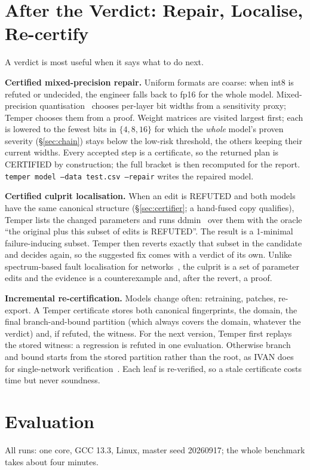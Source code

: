 \documentclass[conference]{IEEEtran}
\begin{document}
\section{After the Verdict: Repair, Localise, Re-certify}\label{sec:lifecycle}
A verdict is most useful when it says what to do next.

\textbf{Certified mixed-precision repair.} Uniform formats are coarse: when int8 is refuted or undecided, the engineer falls back to fp16 for the whole model. Mixed-precision quantisation~\cite{hawq} chooses per-layer bit widths from a sensitivity proxy; Temper chooses them from a proof. Weight matrices are visited largest first; each is lowered to the fewest bits in $\{4,8,16\}$ for which the \emph{whole} model's proven severity (\S\ref{sec:chain}) stays below the low-risk threshold, the others keeping their current widths. Every accepted step is a certificate, so the returned plan is CERTIFIED by construction; the full bracket is then recomputed for the report. \texttt{temper model --data test.csv --repair} writes the repaired model.

\textbf{Certified culprit localisation.} When an edit is REFUTED and both models have the same canonical structure (\S\ref{sec:certifier}; a hand-fused copy qualifies), Temper lists the changed parameters and runs ddmin~\cite{ddmin} over them with the oracle ``the original plus this subset of edits is REFUTED''. The result is a 1-minimal failure-inducing subset. Temper then reverts exactly that subset in the candidate and decides again, so the suggested fix comes with a verdict of its own. Unlike spectrum-based fault localisation for networks~\cite{deepfault}, the culprit is a set of parameter edits and the evidence is a counterexample and, after the revert, a proof.

\textbf{Incremental re-certification.} Models change often: retraining, patches, re-export. A Temper certificate stores both canonical fingerprints, the domain, the final branch-and-bound partition (which always covers the domain, whatever the verdict) and, if refuted, the witness. For the next version, Temper first replays the stored witness: a regression is refuted in one evaluation. Otherwise branch and bound starts from the stored partition rather than the root, as IVAN does for single-network verification~\cite{ivan}. Each leaf is re-verified, so a stale certificate costs time but never soundness.

\section{Evaluation}\label{sec:eval}
All runs: one core, GCC 13.3, Linux, master seed 20260917; the whole benchmark takes about four minutes.
\end{document}
